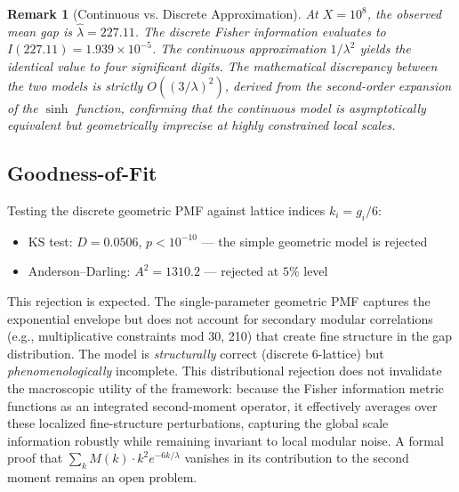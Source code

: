 \documentclass[11pt]{article}
\newtheorem{remark}{Remark}
\begin{document}
\begin{remark}[Continuous vs. Discrete Approximation]
At $X = 10^8$, the observed mean gap is $\hat{\lambda} = 227.11$. The discrete Fisher information evaluates to $I(227.11) = 1.939 \times 10^{-5}$. The continuous approximation $1/\lambda^2$ yields the identical value to four significant digits. The mathematical discrepancy between the two models is strictly $O((3/\lambda)^2)$, derived from the second-order expansion of the $\sinh$ function, confirming that the continuous model is asymptotically equivalent but geometrically imprecise at highly constrained local scales.
\end{remark}

\subsection{Goodness-of-Fit}
Testing the discrete geometric PMF against lattice indices $k_i = g_i/6$:
\begin{itemize}
    \item KS test: $D = 0.0506$, $p < 10^{-10}$ --- the simple geometric model is rejected
    \item Anderson--Darling: $A^2 = 1310.2$ --- rejected at $5\%$ level
\end{itemize}
This rejection is expected. The single-parameter geometric PMF captures the exponential envelope but does not account for secondary modular correlations (e.g., multiplicative constraints mod 30, 210) that create fine structure in the gap distribution. The model is \textit{structurally} correct (discrete 6-lattice) but \textit{phenomenologically} incomplete. This distributional rejection does not invalidate the macroscopic utility of the framework: because the Fisher information metric functions as an integrated second-moment operator, it effectively averages over these localized fine-structure perturbations, capturing the global scale information robustly while remaining invariant to local modular noise. A formal proof that $\sum_k M(k) \cdot k^2 e^{-6k/\lambda}$ vanishes in its contribution to the second moment remains an open problem.
\end{document}
